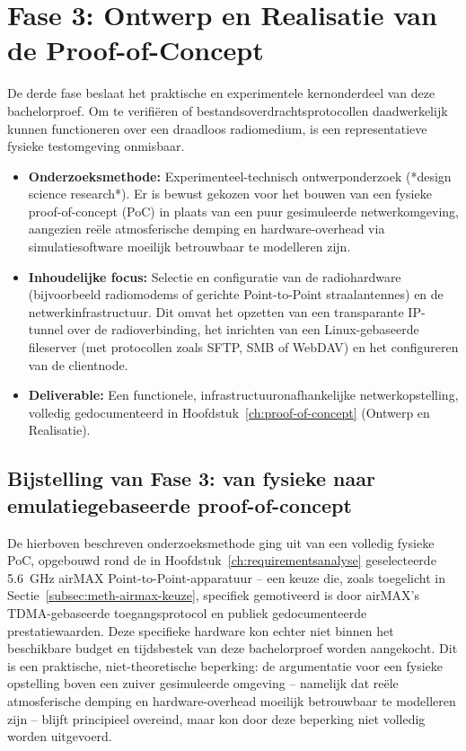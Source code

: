\section{Fase 3: Ontwerp en Realisatie van de Proof-of-Concept}
\label{sec:meth-fase3}
 
De derde fase beslaat het praktische en experimentele kernonderdeel van deze bachelorproef. 
Om te verifiëren of bestandsoverdrachtsprotocollen daadwerkelijk kunnen functioneren over 
een draadloos radiomedium, is een representatieve fysieke testomgeving onmisbaar.
 
\begin{itemize}
    \item \textbf{Onderzoeksmethode:} Experimenteel-technisch ontwerponderzoek (*design science research*). 
    Er is bewust gekozen voor het bouwen van een fysieke proof-of-concept (PoC) in plaats van 
    een puur gesimuleerde netwerkomgeving, aangezien reële atmosferische demping en 
    hardware-overhead via simulatiesoftware moeilijk betrouwbaar te modelleren zijn.
    \item \textbf{Inhoudelijke focus:} Selectie en configuratie van de radiohardware (bijvoorbeeld 
    radiomodems of gerichte Point-to-Point straalantennes) en de netwerkinfrastructuur. Dit omvat 
    het opzetten van een transparante IP-tunnel over de radioverbinding, het inrichten van een 
    Linux-gebaseerde fileserver (met protocollen zoals SFTP, SMB of WebDAV) en het configureren 
    van de clientnode.
    \item \textbf{Deliverable:} Een functionele, infrastructuuronafhankelijke netwerkopstelling, 
    volledig gedocumenteerd in Hoofdstuk~\ref{ch:proof-of-concept} (Ontwerp en Realisatie).
\end{itemize}
 
\subsection{Bijstelling van Fase 3: van fysieke naar emulatiegebaseerde proof-of-concept}%
\label{subsec:meth-bijstelling-fase3}
 
De hierboven beschreven onderzoeksmethode ging uit van een volledig fysieke PoC, opgebouwd
rond de in Hoofdstuk~\ref{ch:requirementsanalyse} geselecteerde 5.6~GHz airMAX
Point-to-Point-apparatuur -- een keuze die, zoals toegelicht in
Sectie~\ref{subsec:meth-airmax-keuze}, specifiek gemotiveerd is door airMAX's
TDMA-gebaseerde toegangsprotocol en publiek gedocumenteerde prestatiewaarden. Deze
specifieke hardware kon echter niet binnen het beschikbare budget en tijdsbestek van
deze bachelorproef worden aangekocht. Dit is een praktische, niet-theoretische
beperking: de argumentatie voor een fysieke opstelling boven een zuiver gesimuleerde
omgeving -- namelijk dat reële atmosferische demping en hardware-overhead moeilijk
betrouwbaar te modelleren zijn -- blijft principieel overeind, maar kon door deze
beperking niet volledig worden uitgevoerd.
 
